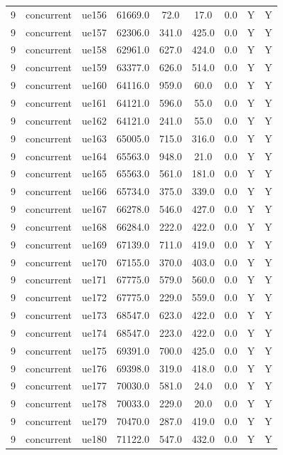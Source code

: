 \begin{table}[ht]
\begin{tabular}{|c|c|c|c|c|c|c|c|c|}
9 & concurrent & ue156 & 61669.0 & 72.0 & 17.0 & 0.0 & Y & Y \\
9 & concurrent & ue157 & 62306.0 & 341.0 & 425.0 & 0.0 & Y & Y \\
9 & concurrent & ue158 & 62961.0 & 627.0 & 424.0 & 0.0 & Y & Y \\
9 & concurrent & ue159 & 63377.0 & 626.0 & 514.0 & 0.0 & Y & Y \\
9 & concurrent & ue160 & 64116.0 & 959.0 & 60.0 & 0.0 & Y & Y \\
9 & concurrent & ue161 & 64121.0 & 596.0 & 55.0 & 0.0 & Y & Y \\
9 & concurrent & ue162 & 64121.0 & 241.0 & 55.0 & 0.0 & Y & Y \\
9 & concurrent & ue163 & 65005.0 & 715.0 & 316.0 & 0.0 & Y & Y \\
9 & concurrent & ue164 & 65563.0 & 948.0 & 21.0 & 0.0 & Y & Y \\
9 & concurrent & ue165 & 65563.0 & 561.0 & 181.0 & 0.0 & Y & Y \\
9 & concurrent & ue166 & 65734.0 & 375.0 & 339.0 & 0.0 & Y & Y \\
9 & concurrent & ue167 & 66278.0 & 546.0 & 427.0 & 0.0 & Y & Y \\
9 & concurrent & ue168 & 66284.0 & 222.0 & 422.0 & 0.0 & Y & Y \\
9 & concurrent & ue169 & 67139.0 & 711.0 & 419.0 & 0.0 & Y & Y \\
9 & concurrent & ue170 & 67155.0 & 370.0 & 403.0 & 0.0 & Y & Y \\
9 & concurrent & ue171 & 67775.0 & 579.0 & 560.0 & 0.0 & Y & Y \\
9 & concurrent & ue172 & 67775.0 & 229.0 & 559.0 & 0.0 & Y & Y \\
9 & concurrent & ue173 & 68547.0 & 623.0 & 422.0 & 0.0 & Y & Y \\
9 & concurrent & ue174 & 68547.0 & 223.0 & 422.0 & 0.0 & Y & Y \\
9 & concurrent & ue175 & 69391.0 & 700.0 & 425.0 & 0.0 & Y & Y \\
9 & concurrent & ue176 & 69398.0 & 319.0 & 418.0 & 0.0 & Y & Y \\
9 & concurrent & ue177 & 70030.0 & 581.0 & 24.0 & 0.0 & Y & Y \\
9 & concurrent & ue178 & 70033.0 & 229.0 & 20.0 & 0.0 & Y & Y \\
9 & concurrent & ue179 & 70470.0 & 287.0 & 419.0 & 0.0 & Y & Y \\
9 & concurrent & ue180 & 71122.0 & 547.0 & 432.0 & 0.0 & Y & Y \\

\end{tabular}
\end{table}
